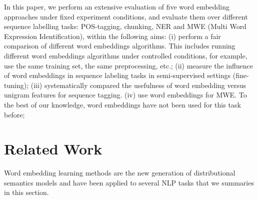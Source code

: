 \documentclass[11pt]{article}
\begin{document}


In this paper, we perform an extensive evaluation of five word embedding approaches under fixed experiment conditions, and evaluate them over different sequence labelling tasks: POS-tagging, chunking, 
NER and MWE (Multi Word Expression Identification), 
within the following aims:
(i) perform a fair comparison of different word embeddings
algorithms. This includes running different word embeddings algorithms under controlled conditions, for example, use the same training set, the same preprocessing, etc.;
(ii) measure the influence of word embeddings in sequence labeling tasks in semi-supervised settings (fine-tuning);
(iii) systematically compared the usefulness of word embedding versus
unigram features for sequence tagging.
(iv) use word embeddings for MWE. To the best of our knowledge, 
word embeddings have not been used for this task before;







\section{Related Work}
Word embedding learning methods are the new generation of distributional semantics models and have been applied to several 
NLP tasks that we summaries in this section.
\end{document}
